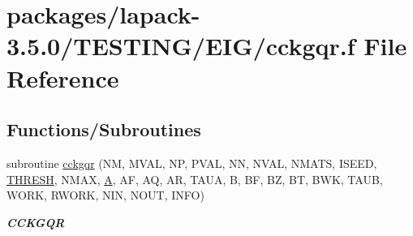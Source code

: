 \hypertarget{cckgqr_8f}{}\section{packages/lapack-\/3.5.0/\+T\+E\+S\+T\+I\+N\+G/\+E\+I\+G/cckgqr.f File Reference}
\label{cckgqr_8f}
\subsection*{Functions/\+Subroutines}
\begin{DoxyCompactItemize}
\item 
subroutine \hyperlink{group__complex__eig_gac0da4fbc5a2c02b848f49c0dd9c3f893}{cckgqr} (N\+M, M\+V\+A\+L, N\+P, P\+V\+A\+L, N\+N, N\+V\+A\+L, N\+M\+A\+T\+S, I\+S\+E\+E\+D, \hyperlink{zlaqgs_8c_a0656018abfc9fa2821827415f5d5ea57}{T\+H\+R\+E\+S\+H}, N\+M\+A\+X, \hyperlink{classA}{A}, A\+F, A\+Q, A\+R, T\+A\+U\+A, B, B\+F, B\+Z, B\+T, B\+W\+K, T\+A\+U\+B, W\+O\+R\+K, R\+W\+O\+R\+K, N\+I\+N, N\+O\+U\+T, I\+N\+F\+O)
\begin{DoxyCompactList}\small\item\em {\bfseries C\+C\+K\+G\+Q\+R} \end{DoxyCompactList}\end{DoxyCompactItemize}
